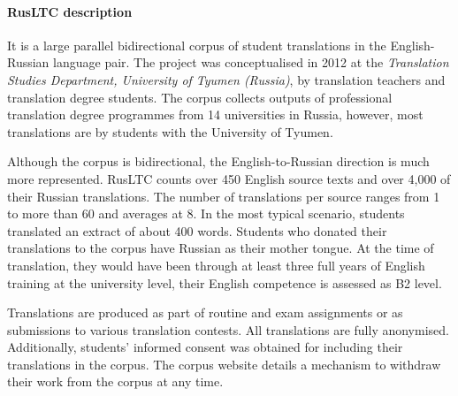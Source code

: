 \paragraph{RusLTC description} It is a large parallel bidirectional corpus of student translations in the English-Russian language pair. The project was conceptualised in 2012 at the \textit{Translation Studies Department, University of Tyumen (Russia)}, by translation teachers and translation degree students. The corpus collects outputs of professional translation degree programmes from 14 universities in Russia, however, most translations are by students with the University of Tyumen. %

Although the corpus is bidirectional, the English-to-Russian direction is much more represented. RusLTC counts over 450 English source texts and over 4,000 of their Russian translations. The number of translations per source ranges from 1 to more than 60 and averages at 8. In the most typical scenario, students translated an extract of about 400 words. Students who donated their translations to the corpus have Russian as their mother tongue. At the time of translation, they would have been through at least three full years of English training at the university level, their English competence is assessed as B2 level.

Translations are produced as part of routine and exam assignments or as submissions to various translation contests. %
All translations are fully anonymised. Additionally, students' informed consent was obtained for including their translations in the corpus. The corpus website details a mechanism to withdraw their work from the corpus at any time.

